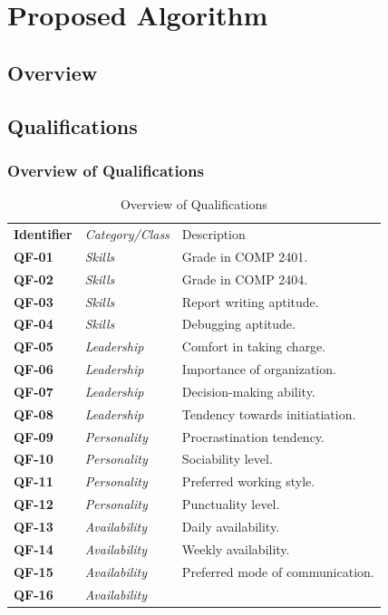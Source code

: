 \documentclass[12pt,letterpaper]{article}
\begin{document}
\vspace{1em}

\section{Proposed Algorithm}

\subsection{Overview}

\subsection{Qualifications}

\subsubsection{Overview of Qualifications}

\begin{table}[H]
	\caption{Overview of Qualifications}
	\begin{tabu} to 
	    \tableheader{}Identifier & Category/Class & Description\\
		QF-01 & Skills & Grade in COMP 2401.\\
		QF-02 & Skills & Grade in COMP 2404.\\
		QF-03 & Skills & Report writing aptitude.\\
		QF-04 & Skills & Debugging aptitude.\\
		QF-05 & Leadership & Comfort in taking charge. \\
		QF-06 & Leadership & Importance of organization. \\
		QF-07 & Leadership & Decision-making ability. \\
		QF-08 & Leadership & Tendency towards initiatiation. \\
		QF-09 & Personality & Procrastination tendency. \\
		QF-10 & Personality & Sociability level. \\
		QF-11 & Personality & Preferred working style. \\
		QF-12 & Personality & Punctuality level. \\
		QF-13 & Availability & Daily availability. \\
		QF-14 & Availability & Weekly availability. \\
		QF-15 & Availability & Preferred mode of communication. \\
		QF-16 & Availability & \\
	\end{tabu}
\end{table}
\end{document}
